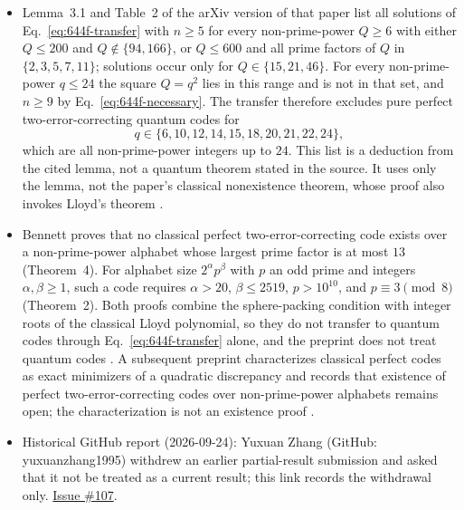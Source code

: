 \begin{itemize}
  \item Lemma~3.1 and Table~2 of the arXiv version of that paper list all solutions
  of Eq.~\eqref{eq:644f-transfer} with $n\geq5$ for every non-prime-power
  $Q\geq6$ with either $Q\leq200$ and $Q\notin\{94,166\}$, or $Q\leq600$ and all
  prime factors of $Q$ in $\{2,3,5,7,11\}$; solutions occur only for
  $Q\in\{15,21,46\}$.  For every non-prime-power $q\leq24$ the square $Q=q^2$
  lies in this range and is not in that set, and $n\geq9$ by
  Eq.~\eqref{eq:644f-necessary}.  The transfer therefore excludes pure perfect
  two-error-correcting quantum codes for
  \begin{equation}
    q\in\{6,10,12,14,15,18,20,21,22,24\},
    \label{eq:644f-excluded}
  \end{equation}
  which are all non-prime-power integers up to $24$.  This list is a deduction
  from the cited lemma, not a quantum theorem stated in the source.  It uses only
  the lemma, not the paper's classical nonexistence theorem, whose proof also
  invokes Lloyd's theorem .

  \item Bennett proves that no classical perfect two-error-correcting code exists
  over a non-prime-power alphabet whose largest prime factor is at most $13$
  (Theorem~4).  For alphabet size $2^\alpha p^\beta$ with $p$ an odd prime and
  integers $\alpha,\beta\geq1$, such a code requires $\alpha>20$,
  $\beta\leq2519$, $p>10^{10}$, and $p\equiv3\pmod 8$ (Theorem~2).  Both
  proofs combine the sphere-packing condition with integer roots of the
  classical Lloyd polynomial, so they do not transfer to quantum codes through
  Eq.~\eqref{eq:644f-transfer} alone, and the preprint does not treat quantum
  codes .  A subsequent preprint
  characterizes classical perfect codes as exact minimizers of a quadratic
  discrepancy and records that existence of perfect two-error-correcting codes
  over non-prime-power alphabets remains open; the characterization is not an
  existence proof .

  \item Historical GitHub report (2026-09-24): Yuxuan Zhang (GitHub: yuxuanzhang1995) withdrew an earlier partial-result submission and asked that it not be treated as a current result; this link records the withdrawal only. \href{https://github.com/Naixu-Guo/quantum-open-problems/issues/107}{Issue \#107}.
\end{itemize}

